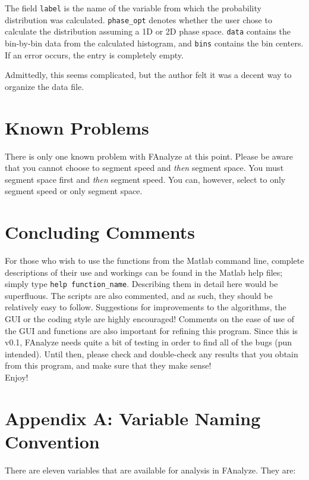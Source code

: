 \documentclass[letterpaper, 11pt]{article}
\begin{document}
The field \texttt{label} is the name of the variable from which the probability distribution was
calculated. \texttt{phase\_opt} denotes whether the user chose to calculate the distribution
assuming a 1D or 2D phase space. \texttt{data} contains the bin-by-bin data from the calculated
histogram, and \texttt{bins} contains the bin centers.  If an error occurs, the entry is completely
empty.

Admittedly, this seems complicated, but the author felt it was a decent way to organize the data
file.

\section{Known Problems}

There is only one known problem with FAnalyze at this point.  Please be aware that you cannot
choose to segment speed and \emph{then} segment space.  You must segment space first and
\emph{then} segment speed. You can, however, select to only segment speed or only segment space.


\section{Concluding Comments}

For those who wish to use the functions from the Matlab command line, complete descriptions of
their use and workings can be found in the Matlab help files; simply type \texttt{help
function\_name}.  Describing them in detail here would be superfluous.  The scripts are also
commented, and as such, they should be relatively easy to follow. Suggestions for improvements to
the algorithms, the GUI or the coding style are highly encouraged!  Comments on the ease of use of
the GUI and functions are also important for refining this program.  Since this is v0.1, FAnalyze
needs quite a bit of testing in order to find all of the bugs (pun intended).  Until then, please
check and double-check any results that you obtain from this program, and make sure that they make sense! \\

\noindent Enjoy!


\section{Appendix A: Variable Naming Convention}
There are eleven variables that are available for analysis in FAnalyze.  They are:\\
\end{document}
